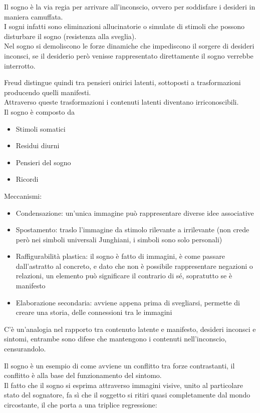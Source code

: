 \documentclass[
]{article}
\providecommand{\tightlist}{%
  \setlength{\itemsep}{0pt}\setlength{\parskip}{0pt}}
\begin{document}
Il sogno è la via regia per arrivare all'inconscio, ovvero per
soddisfare i desideri in maniera camuffata.\\
I sogni infatti sono eliminazioni allucinatorie o simulate di stimoli
che possono disturbare il sogno (resistenza alla sveglia).\\
Nel sogno si demoliscono le forze dinamiche che impediscono il sorgere
di desideri inconsci, se il desiderio però venisse rappresentato
direttamente il sogno verrebbe interrotto.

Freud distingue quindi tra pensieri onirici latenti, sottoposti a
trasformazioni producendo quelli manifesti.\\
Attraverso queste trasformazioni i contenuti latenti diventano
irriconoscibili.\\
Il sogno è composto da

\begin{itemize}
\tightlist
\item
  Stimoli somatici
\item
  Residui diurni
\item
  Pensieri del sogno
\item
  Ricordi
\end{itemize}

Meccanismi:

\begin{itemize}
\tightlist
\item
  Condensazione: un'unica immagine può rappresentare diverse idee
  associative
\item
  Spostamento: traslo l'immagine da stimolo rilevante a irrilevante (non
  crede però nei simboli universali Junghiani, i simboli sono solo
  personali)
\item
  Raffigurabilità plastica: il sogno è fatto di immagini, è come passare
  dall'astratto al concreto, e dato che non è possibile rappresentare
  negazioni o relazioni, un elemento può significare il contrario di sé,
  sopratutto se è manifesto
\item
  Elaborazione secondaria: avviene appena prima di svegliarsi, permette
  di creare una storia, delle connessioni tra le immagini
\end{itemize}

C'è un'analogia nel rapporto tra contenuto latente e manifesto, desideri
inconsci e sintomi, entrambe sono difese che mantengono i contenuti
nell'inconscio, censurandolo.

Il sogno è un esempio di come avviene un conflitto tra forze
contrastanti, il conflitto è alla base del funzionamento del sintomo.\\
Il fatto che il sogno si esprima attraverso immagini visive, unito al
particolare stato del sognatore, fa sì che il soggetto si ritiri quasi
completamente dal mondo circostante, il che porta a una triplice
regressione:
\end{document}
